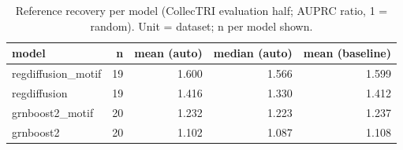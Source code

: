 \begin{table}[H]\centering\small
\caption{Reference recovery per model (CollecTRI evaluation half; AUPRC ratio, 1 = random). Unit = dataset; n per model shown.}
\begin{tabular}{lrrrr}\toprule
model & n & mean (auto) & median (auto) & mean (baseline) \\ \midrule
regdiffusion\_motif & 19 & 1.600 & 1.566 & 1.599 \\
regdiffusion & 19 & 1.416 & 1.330 & 1.412 \\
grnboost2\_motif & 20 & 1.232 & 1.223 & 1.237 \\
grnboost2 & 20 & 1.102 & 1.087 & 1.108 \\
\bottomrule\end{tabular}\end{table}
